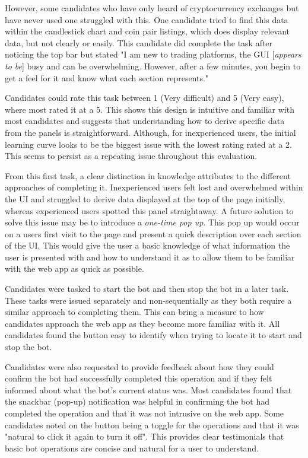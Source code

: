 However, some candidates who have only heard of cryptocurrency exchanges but have never used one struggled with this. One candidate tried to find this data within the candlestick chart and coin pair listings, which does display relevant data, but not clearly or easily. This candidate did complete the task after noticing the top bar but stated "I am new to trading platforms, the GUI [\textit{appears to be}] busy and can be overwhelming. However, after a few minutes, you begin to get a feel for it and know what each section represents." 

Candidates could rate this task between 1 (Very difficult) and 5 (Very easy), where most rated it at a 5. This shows this design is intuitive and familiar with most candidates and suggests that understanding how to derive specific data from the panels is straightforward. Although, for inexperienced users, the initial learning curve looks to be the biggest issue with the lowest rating rated at a 2. This seems to persist as a repeating issue throughout this evaluation.

From this first task, a clear distinction in knowledge attributes to the different approaches of completing it. Inexperienced users felt lost and overwhelmed within the UI and struggled to derive data displayed at the top of the page initially, whereas experienced users spotted this panel straightaway. A future solution to solve this issue may be to introduce a \textit{one-time pop up}. This pop up would occur on a users first visit to the page and present a quick description over each section of the UI. This would give the user a basic knowledge of what information the user is presented with and how to understand it as to allow them to be familiar with the web app as quick as possible.

\noindent Candidates were tasked to start the bot and then stop the bot in a later task. These tasks were issued separately and non-sequentially as they both require a similar approach to completing them. This can bring a measure to how candidates approach the web app as they become more familiar with it. All candidates found the button easy to identify when trying to locate it to start and stop the bot.

Candidates were also requested to provide feedback about how they could confirm the bot had successfully completed this operation and if they felt informed about what the bot's current status was. Most candidates found that the snackbar (pop-up) notification was helpful in confirming the bot had completed the operation and that it was not intrusive on the web app. Some candidates noted on the button being a toggle for the operations and that it was "natural to click it again to turn it off". This provides clear testimonials that basic bot operations are concise and natural for a user to understand.

